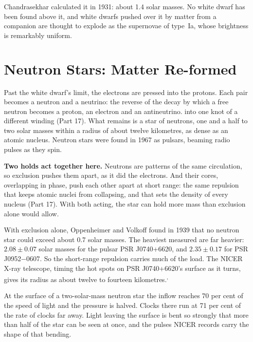 \documentclass[11pt,a4paper]{article}
\begin{document}
 Chandrasekhar calculated it in 1931: about 1.4 solar masses. No white dwarf has been found above it, and white dwarfs pushed over it by matter from a companion are thought to explode as the supernovae of type~Ia, whose brightness is remarkably uniform.

\section{Neutron Stars: Matter Re-formed}

Past the white dwarf's limit, the electrons are pressed into the protons. Each pair becomes a neutron and a neutrino: the reverse of the decay by which a free neutron becomes a proton, an electron and an antineutrino.  into one knot of a different winding (Part 17). What remains is a star of neutrons, one and a half to two solar masses within a radius of about twelve kilometres, as dense as an atomic nucleus. Neutron stars were found in 1967 as pulsars, beaming radio pulses as they spin.

\begin{hypbar}
\textbf{Two holds act together here.} Neutrons are patterns of the same circulation, so exclusion pushes them apart, as it did the electrons. And their cores, overlapping in phase, push each other apart at short range: the same repulsion that keeps atomic nuclei from collapsing, and that sets the density of every nucleus (Part 17). With both acting, the star can hold more mass than exclusion alone would allow.
\end{hypbar}

 With exclusion alone, Oppenheimer and Volkoff found in 1939 that no neutron star could exceed about 0.7 solar masses. The heaviest measured are far heavier: $2.08\pm0.07$ solar masses for the pulsar PSR J0740+6620, and $2.35\pm0.17$ for PSR J0952$-$0607. So the short-range repulsion carries much of the load. The NICER X-ray telescope, timing the hot spots on PSR J0740+6620's surface as it turns, gives its radius as about twelve to fourteen kilometres.\textsuperscript{,}

At the surface of a two-solar-mass neutron star the inflow reaches 70 per cent of the speed of light and the pressure is halved. Clocks there run at 71 per cent of the rate of clocks far away. Light leaving the surface is bent so strongly that more than half of the star can be seen at once, and the pulses NICER records carry the shape of that bending.
\end{document}
